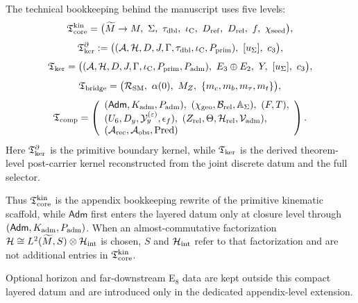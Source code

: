 \begin{construction}
The technical bookkeeping behind the manuscript uses five levels:
\[
\Tcore^{\mathrm{kin}}
=
\bigl(
\widetilde M\to M,\ \Seam,\ \taudbl,\ \iC,\ D_{\mathrm{ref}},\ D_{\mathrm{rel}},\ f,\ \chiseed
\bigr),
\]
\[
\Tker^\partial
:=
\bigl(
(\mathcal A,\mathcal H,D,J,\Gamma,\taudbl,\iC,\Pprim),\ [u_\Sigma],\ \cthree
\bigr),
\]
\[
\Tker
=
\bigl(
(\mathcal A,\mathcal H,D,J,\Gamma,\iC,\Pprim,\Padm),\ E_3\oplus E_2,\ Y,\ [u_\Sigma],\ \cthree
\bigr),
\]
\[
\mathfrak T_{\mathrm{bridge}}
=
\bigl(
\mathcal R_{\mathrm{SM}},\ \alpha(0),\ M_Z,\ \{m_c,m_b,m_\tau,m_t\}
\bigr),
\]
\[
\Tcomp
=
\left(
\begin{array}{l}
(\mathsf{Adm},\Kadm,\Padm),\ (\chigeo,\mathcal B_{\mathrm{rel}},\mathbb A_{\Seam}),\ (F,T),\\
(U_6,D_y,\mathcal Y_y^{(\varepsilon)},\epsilon_f),\ (Z_{\mathrm{rel}},\Theta,\Hrel,\Vadm),\\
(\Arec,\Aobs,\Pred)
\end{array}
\right).
\]
Here $\mathfrak T_{\mathrm{ker}}^\partial$ is the primitive boundary kernel, while $\mathfrak T_{\mathrm{ker}}$ is the derived theorem-level
post-carrier kernel reconstructed from the joint discrete datum and the full selector.
\end{construction}

Thus $\mathfrak T_{\mathrm{core}}^{\mathrm{kin}}$ is the appendix bookkeeping rewrite of the primitive kinematic
scaffold, while $\mathsf{Adm}$ first enters the layered datum only at closure level through
$(\mathsf{Adm},K_{\mathrm{adm}},P_{\mathrm{adm}})$. When an almost-commutative factorization
$\mathcal H\cong L^2(\widetilde M,S)\otimes\mathcal H_{\mathrm{int}}$ is chosen, $S$ and $\mathcal H_{\mathrm{int}}$ refer to that
factorization and are not additional entries in $\mathfrak T_{\mathrm{core}}^{\mathrm{kin}}$.

Optional horizon and far-downstream E$_8$ data are kept outside this compact layered datum and are introduced only in the dedicated appendix-level extension.

